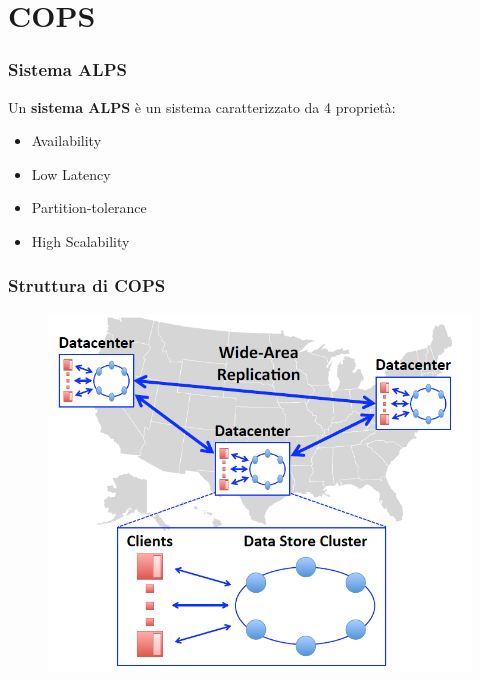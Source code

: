 \section{COPS}
\begin{frame}
\frametitle{Sistema ALPS}
	\begin{definizione}
	Un \textbf{sistema ALPS} è un sistema caratterizzato da 4 proprietà:
	\begin{itemize}
		\item<1-> Availability
		\item<1-> Low Latency
		\item<1-> Partition-tolerance
		\item<1-> High Scalability
	\end{itemize}
	\end{definizione}
\end{frame}

\begin{frame}
\frametitle{Struttura di COPS}
	\begin{figure}
		\centering
		\includegraphics[scale=0.45]{COPS/COPS1.png}
	\end{figure}
\end{frame}

